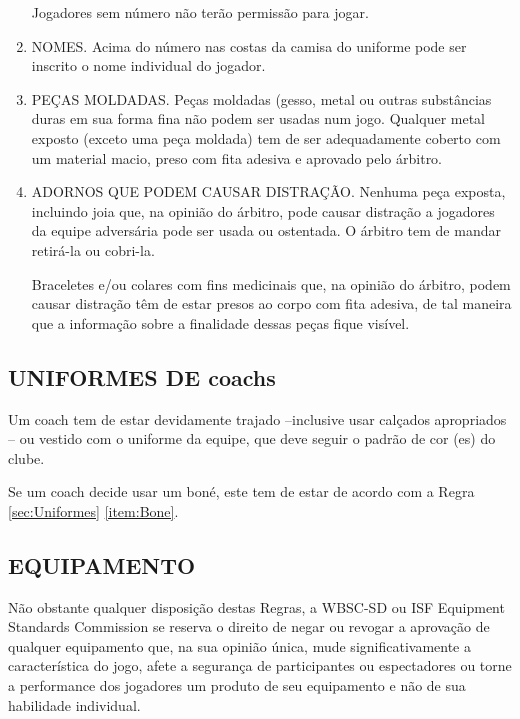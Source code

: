 \begin{multicols}{2}
\begin{enumerate}[label=\alph*)]
		Jogadores sem n\'umero n\~ao ter\~ao permiss\~ao para jogar. 
		
		\item  NOMES. Acima do n\'umero nas costas da camisa do uniforme pode ser inscrito o nome individual do jogador. 
		
		\item  PE\c{C}AS MOLDADAS. Pe\c{c}as moldadas (gesso, metal ou outras subst\^ancias duras em sua forma fina  n\~ao podem ser usadas num jogo. Qualquer metal exposto (exceto uma pe\c{c}a moldada) tem de ser adequadamente coberto com um material macio, preso com fita adesiva e aprovado pelo \'arbitro. 
		
		\item  ADORNOS QUE PODEM CAUSAR DISTRA\c{C}\~AO. Nenhuma pe\c{c}a exposta, incluindo joia que, na opini\~ao do \'arbitro, pode causar distra\c{c}\~ao a jogadores da equipe advers\'aria pode ser usada ou ostentada. O \'arbitro tem de mandar retir\'a-la ou cobri-la. 
		
		Braceletes e/ou colares com fins medicinais que, na opini\~ao do \'arbitro, podem causar distra\c{c}\~ao t\^em de estar presos ao corpo com fita adesiva, de tal maneira que a informa\c{c}\~ao sobre a finalidade dessas pe\c{c}as fique vis\'ivel. 
		
	\end{enumerate}
	\end{multicols}
	\subsection{UNIFORMES DE \Glspl{coach}}\label{sec:UniformesCoach}
	\begin{multicols}{2}
	Um \gls{coach} tem de estar devidamente trajado –inclusive usar cal\c{c}ados apropriados -- ou vestido com o uniforme da equipe, que deve seguir o padr\~ao de cor (es) do clube.
	
	 {\color{red!80}Se um \gls{coach} decide usar um bon\'e, este tem de estar de acordo com a Regra \ref{sec:Uniformes} \ref{item:Bone}}. 
	 
	\subsection{EQUIPAMENTO} 
	N\~ao obstante qualquer disposi\c{c}\~ao destas Regras, a WBSC-SD ou ISF Equipment Standards Commission se reserva o direito de negar ou revogar a aprova\c{c}\~ao de qualquer equipamento que, na sua opini\~ao \'unica, mude significativamente a caracter\'istica do jogo, afete a seguran\c{c}a de participantes ou espectadores ou torne a performance dos jogadores um produto de seu equipamento e n\~ao de sua habilidade individual. 
	\end{multicols}

